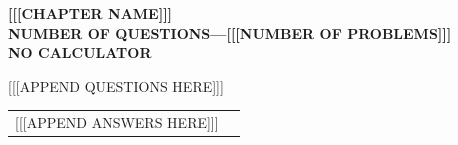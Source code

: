 \documentclass[letterstyle,12pt]{extarticle}
\newcounter{qcounter}
\begin{document}
\begin{center}
    {\bf
    \MakeUppercase{[[[CHAPTER NAME]]]\\[1ex]
    NUMBER OF QUESTIONS—[[[NUMBER OF PROBLEMS]]] \\[1ex] 
    NO CALCULATOR \\[5ex]
    }}
\end{center}

\begin{list}{\textbf{.}~}{}
\setlength\itemsep{3em}

[[[APPEND QUESTIONS HERE]]]

\end{list}

\clearpage 

\twocolumn

\begin{supertabular}{ll}
[[[APPEND ANSWERS HERE]]]
\end{supertabular}
\end{document}

